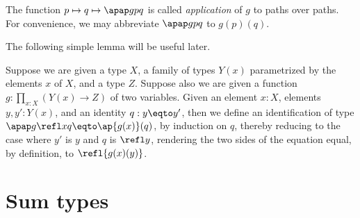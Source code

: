 The function $p \mapsto q \mapsto \apap g p q$ is called \emph{application} of $g$ to paths over paths.
For convenience, we may abbreviate $\apap g p q$ to $g(p)(q)$.

The following simple lemma will be useful later.

\begin{definition}\label{def:applfun2comp}
  Suppose we are given a type $X$, a family of types $Y(x)$ parametrized by the elements $x$ of $X$, and a type $Z$.  Suppose also we are given
  a function $g : \prod_{x:X} (Y(x) \to Z)$ of two variables.  Given an element $x:X$, elements $y, y':Y(x)$, and an identity $q : y \eqto y'$, then
  we define an identification of type $\apap g {\refl x} q \eqto \ap {g(x)}(q)$, by induction on $q$, thereby reducing to the case where $y'$ is
  $y$ and $q$ is $\refl y$, rendering the two sides of the equation equal, by definition, to $\refl {g(x)(y)}$.
\end{definition}

\section{Sum types}
\label{sec:sum-types}

